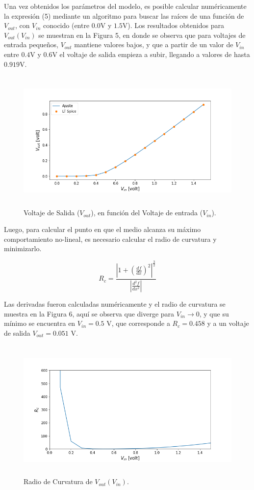\documentclass[letterpaper,oneside]{article}
\begin{document}
Una vez obtenidos los parámetros del modelo, es posible calcular numéricamente la expresión (5) mediante un algoritmo para buscar las raíces de una función de $V_{out}$, con $V_{in}$ conocido (entre $0.0$V y $1.5$V). Los resultados obtenidos para $V_{out}(V_{in})$ se muestran en la Figura 5, en donde se observa que para voltajes de entrada pequeños, $V_{out}$ mantiene valores bajos, y que a partir de un valor de $V_{in}$ entre $0.4$V y $0.6$V el voltaje de salida empieza a subir, llegando a valores de hasta $0.919$V.

\begin{figure}
  \centering
  \includegraphics[height=7cm]{../graficos/curvavinvout.png}
  \caption{Voltaje de Salida ($V_{out}$), en función del Voltaje de entrada ($V_{in}$).}
\end{figure}

Luego, para calcular el punto en que el medio alcanza su máximo comportamiento no-lineal, es necesario calcular el radio de curvatura y minimizarlo.

\begin{equation}
    R_c = \frac{|1+(\frac{df}{dx})^2|^{\frac{3}{2}}}{|\frac{d^2f}{dx^2}|}
\end{equation}

Las derivadas fueron calculadas numéricamente y el radio de curvatura se muestra en la Figura 6, aquí se observa que diverge para $V_{in} \rightarrow 0$, y que su mínimo se encuentra en $V_{in}= 0.5$ V, que corresponde a $R_c = 0.458$ y a un voltaje de salida $V_{out}=0.051$ V.

\begin{figure}
  \centering
  \includegraphics[height=7cm]{../graficos/radiocurvatura.png}
  \caption{Radio de Curvatura de $V_{out}(V_{in})$.}
\end{figure}
\end{document}
